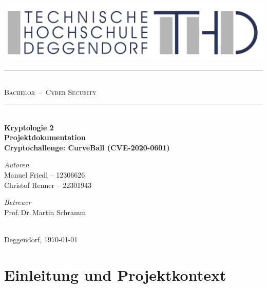 \documentclass{article}
\begin{document}
\begin{titlepage}
  \begin{center}
    \includegraphics[width=\textwidth]{THD-Logo.pdf}
    \vspace{1cm}
    \rule{\textwidth}{1mm}\\[0.3cm]
    \textsc{\scshape \huge Bachelor \,--\, Cyber Security}\\
    \rule{\textwidth}{1mm}\\[1.8cm]

    {\Large \bfseries Kryptologie 2}\\[1cm]
    {\Huge \bfseries Projektdokumentation}\\[0.5cm]
    {\Large \bfseries Cryptochallenge: CurveBall (CVE-2020-0601)}\\[2cm]

    \begin{minipage}[t]{0.45\textwidth}
      \begin{flushleft}
        \normalsize \emph{Autoren}\\
        Manuel Friedl – 12306626\\
        Christof Renner – 22301943
      \end{flushleft}
    \end{minipage}
    \hfill
    \begin{minipage}[t]{0.45\textwidth}
      \begin{flushright}
        \normalsize \emph{Betreuer}\\
        Prof.\,Dr.\,Martin Schramm
      \end{flushright}
    \end{minipage}\\[2cm]

    {\large Deggendorf, \today}
  \end{center}
\end{titlepage}

\newpage
{}
\tableofcontents
\newpage
{}

\section{Einleitung und Projektkontext}
\end{document}
